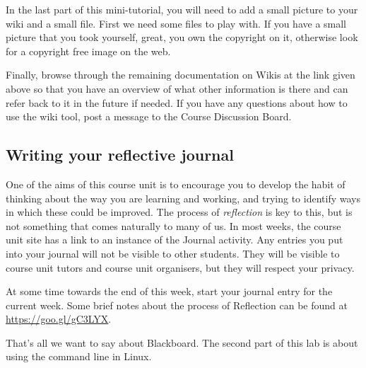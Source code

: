 \begin{firstonly}
In the last part of this mini-tutorial, you will need to add a small
picture to your wiki and a small file. First we need some files to
play with. If you have a small picture that you took yourself, great,
you own the copyright on it, otherwise look for a copyright free image
on the web.

Finally, browse through the remaining documentation on Wikis at the
link given above so that you have an overview of what other
information is there and can refer back to it in the future if
needed. If you have any questions about how to use the wiki tool, post
a message to the Course Discussion Board.


\subsection{Writing your reflective journal}
\label{sec:writing-your-journal}

One of the aims of this course unit is to encourage you to develop the
habit of thinking about the way you are learning and working, and
trying to identify ways in which these could be improved. The process
of \emph{reflection} is key to this, but is not something that comes
naturally to many of us. In most weeks, the course unit site
has a link to an instance of the Journal activity. Any entries you put
into your journal will not be visible to other students. They will be
visible to course unit tutors and course unit organisers, but they
will respect your privacy. 

At some time towards the end of this week, start your journal entry
for the current week. Some brief notes about the process of Reflection
can be found at \url{https://goo.gl/gC3LYX}.

That's all we want to say about Blackboard. The second part of this
lab is about using the command line in Linux.
  
\end{firstonly}

